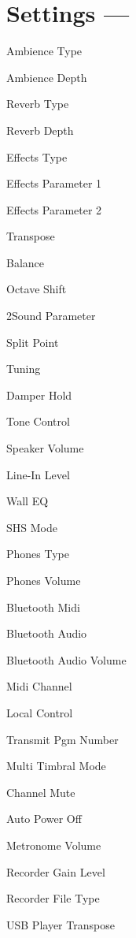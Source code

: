 \section[Settings]{Settings --- \UiKey{\SET}}

Ambience Type


Ambience Depth

Reverb Type


Reverb Depth

Effects Type

Effects Parameter 1


Effects Parameter 2

Transpose


Balance

Octave Shift

2Sound Parameter


Split Point




Tuning

Damper Hold

Tone Control


Speaker Volume

Line-In Level


Wall EQ

SHS Mode

Phones Type


Phones Volume

Bluetooth Midi


Bluetooth Audio

Bluetooth Audio Volume

Midi Channel


Local Control

Transmit Pgm Number


Multi Timbral Mode

Channel Mute

Auto Power Off


Metronome Volume

Recorder Gain Level


Recorder File Type

USB Player Transpose
